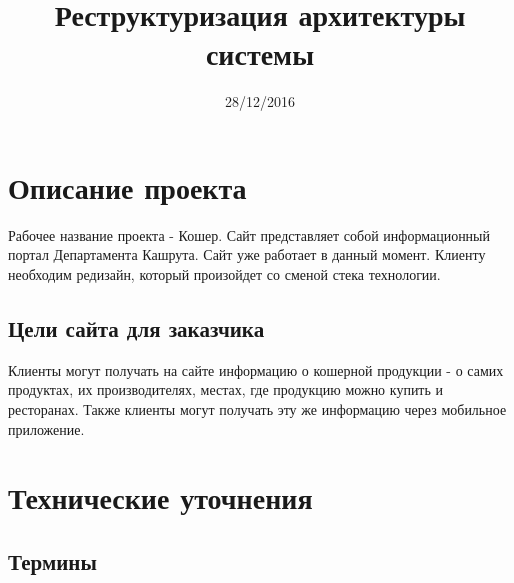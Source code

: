 \documentclass[DIV=calc, paper=a4, fontsize=11pt]{scrartcl} %
\title{Реструктуризация архитектуры системы} %
\date{28/12/2016}
\begin{document}
\maketitle

\section{Описание проекта}
Рабочее название проекта - Кошер. Сайт представляет собой информационный портал Департамента Кашрута. Сайт уже работает в данный момент. Клиенту необходим редизайн, который произойдет со сменой стека технологии.

\subsection{Цели сайта для заказчика}

Клиенты могут получать на сайте информацию о кошерной продукции - о самих продуктах, их производителях, местах, где продукцию можно купить и ресторанах. Также клиенты могут получать эту же информацию через мобильное приложение.


\section{Технические уточнения}

\subsection{Термины}
\end{document}
